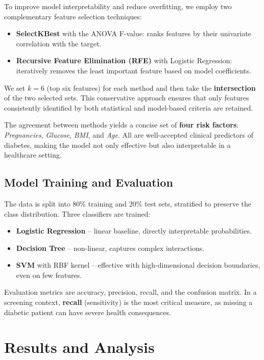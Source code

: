 \documentclass[12pt,a4paper]{article}
\begin{document}
To improve model interpretability and reduce overfitting, we employ two complementary feature selection techniques:
\begin{itemize}
    \item \textbf{SelectKBest} with the ANOVA F-value: ranks features by their univariate correlation with the target.
    \item \textbf{Recursive Feature Elimination (RFE)} with Logistic Regression: iteratively removes the least important feature based on model coefficients.
\end{itemize}

We set $k=6$ (top six features) for each method and then take the \textbf{intersection} of the two selected sets. This conservative approach ensures that only features consistently identified by both statistical and model-based criteria are retained.

The agreement between methods yields a concise set of \textbf{four risk factors}: \emph{Pregnancies}, \emph{Glucose}, \emph{BMI}, and \emph{Age}. All are well-accepted clinical predictors of diabetes, making the model not only effective but also interpretable in a healthcare setting.

\subsection{Model Training and Evaluation}
\label{subsec:evaluation}

The data is split into 80\% training and 20\% test sets, stratified to preserve the class distribution. Three classifiers are trained:
\begin{itemize}
    \item \textbf{Logistic Regression} -- linear baseline, directly interpretable probabilities.
    \item \textbf{Decision Tree} -- non-linear, captures complex interactions.
    \item \textbf{SVM} with RBF kernel -- effective with high-dimensional decision boundaries, even on few features.
\end{itemize}

Evaluation metrics are accuracy, precision, recall, and the confusion matrix. In a screening context, \textbf{recall} (sensitivity) is the most critical measure, as missing a diabetic patient can have severe health consequences.

\section{Results and Analysis}
\label{sec:results}
\end{document}
